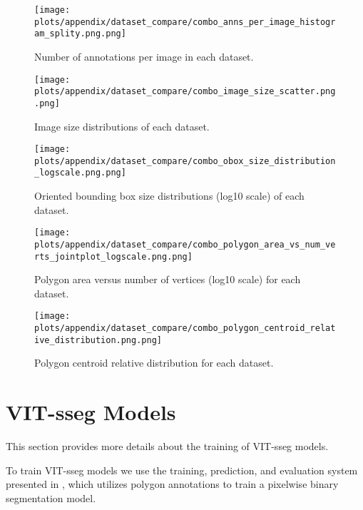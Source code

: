 \begin{figure*}[ht]
\centering
\texttt{[image: plots/appendix/dataset\_compare/combo\_anns\_per\_image\_histogram\_splity.png.png]}
\caption[]{
    Number of annotations per image in each dataset.
}
\label{fig:combo_anns_per_image_histogram_splity}
\end{figure*}


\begin{figure*}[ht]
\centering
\texttt{[image: plots/appendix/dataset\_compare/combo\_image\_size\_scatter.png.png]}
\caption[]{
    Image size distributions of each dataset.
}
\label{fig:combo_image_size_scatter}
\end{figure*}


\begin{figure*}[ht]
\centering
\texttt{[image: plots/appendix/dataset\_compare/combo\_obox\_size\_distribution\_logscale.png.png]}
\caption[]{
    Oriented bounding box size distributions (log10 scale) of each dataset.
}
\label{fig:combo_obox_size_distribution_logscale}
\end{figure*}

\begin{figure*}[ht]
\centering
\texttt{[image: plots/appendix/dataset\_compare/combo\_polygon\_area\_vs\_num\_verts\_jointplot\_logscale.png.png]}
\caption[]{
    Polygon area versus number of vertices (log10 scale) for each dataset.
}
\label{fig:combo_polygon_area_vs_num_verts_jointplot}
\end{figure*}

\begin{figure*}[ht]
\centering
\texttt{[image: plots/appendix/dataset\_compare/combo\_polygon\_centroid\_relative\_distribution.png.png]}
\caption[]{
    Polygon centroid relative distribution for each dataset.
}
\label{fig:combo_polygon_centroid_relative_distribution}
\end{figure*}


\section{VIT-sseg Models}
\label{sec:vit_models}

This section provides more details about the training of VIT-sseg models.

To train VIT-sseg models we use the training, prediction, and evaluation system presented in
  \cite{Greenwell_2024_WACV, crall_geowatch_2024}, which utilizes polygon annotations to train a pixelwise
  binary segmentation model.


